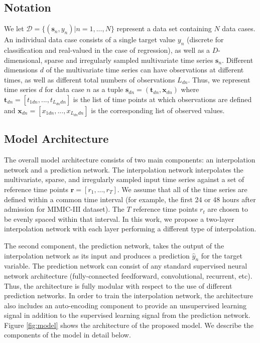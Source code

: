 \documentclass{article} \usepackage{iclr2019_conference,times}
\newcommand{\mbf}[1]{\mathbf{#1}}
\begin{document}
\subsection{Notation}

We let $\mathcal{D}=\{(\mbf{s}_n,y_n) | n=1,...,N\}$ represent a data set containing
$N$ data cases. An individual data case consists of
a single target value $y_n$ (discrete for classification
and real-valued in the case of regression), as well as a $D$-dimensional, sparse and irregularly
sampled multivariate time series $\mbf{s}_n$. Different dimensions $d$ of the multivariate
time series can have observations at different times, as well as different total
numbers of observations $L_{dn}$. Thus, we represent time series $d$ for data case $n$ as a tuple
$\mbf{s}_{dn}=(\mbf{t}_{dn}, \mbf{x}_{dn})$  where $\mbf{t}_{dn}=[t_{1dn},...,t_{L_{dn}dn}]$
is the list of time points at which observations are defined and 
$\mbf{x}_{dn}=[x_{1dn},...,x_{L_{dn}dn}]$ is the corresponding list of observed values.

\subsection{Model Architecture}

The overall model architecture consists of two main components: an interpolation
network and a prediction network. The interpolation network interpolates
the multivariate, sparse, and irregularly sampled input time series against 
a set of reference time points $\mbf{r}=[r_1,...,r_T]$. We assume that all of the 
time series are defined within a common time interval (for example, the first 24 or 48  
hours after admission for MIMIC-III dataset). The $T$ reference time points $r_t$ are chosen to be evenly 
spaced within that interval. In this work, we propose a two-layer interpolation network with each layer performing a different type of interpolation.

The second component, the prediction network, takes the output of the interpolation
network as its input and produces a prediction $\hat{y}_n$ for the target variable.
The prediction network can consist of any standard supervised 
neural network architecture (fully-connected feedforward, convolutional, recurrent, etc).
Thus, the architecture is fully modular with respect to the use of different prediction
networks. In order to train the interpolation network, the architecture also includes
an auto-encoding component to provide an unsupervised learning signal in addition to
the supervised learning signal from the prediction network. Figure \ref{fig:model} shows the architecture of the proposed model. We describe the components
of the model in detail below. 
\end{document}
